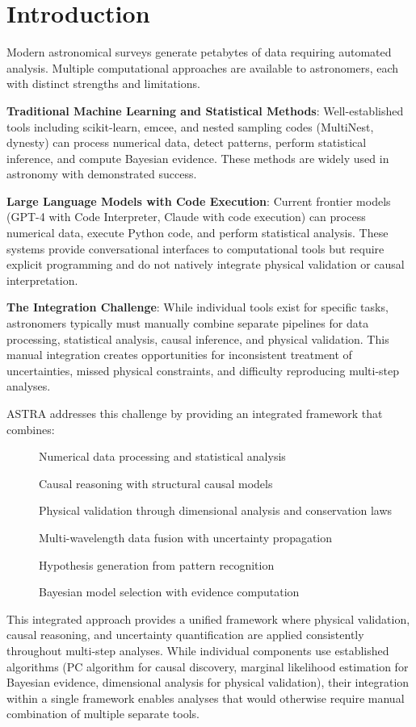 \documentclass[usenatbib]{rasti}
\begin{document}
\section{Introduction}

Modern astronomical surveys generate petabytes of data requiring automated analysis. Multiple computational approaches are available to astronomers, each with distinct strengths and limitations.

\textbf{Traditional Machine Learning and Statistical Methods}: Well-established tools including scikit-learn, emcee, and nested sampling codes (MultiNest, dynesty) can process numerical data, detect patterns, perform statistical inference, and compute Bayesian evidence. These methods are widely used in astronomy with demonstrated success.

\textbf{Large Language Models with Code Execution}: Current frontier models (GPT-4 with Code Interpreter, Claude with code execution) can process numerical data, execute Python code, and perform statistical analysis. These systems provide conversational interfaces to computational tools but require explicit programming and do not natively integrate physical validation or causal interpretation.

\textbf{The Integration Challenge}: While individual tools exist for specific tasks, astronomers typically must manually combine separate pipelines for data processing, statistical analysis, causal inference, and physical validation. This manual integration creates opportunities for inconsistent treatment of uncertainties, missed physical constraints, and difficulty reproducing multi-step analyses.

ASTRA addresses this challenge by providing an integrated framework that combines:
\begin{description}
\item[] Numerical data processing and statistical analysis
\item[] Causal reasoning with structural causal models
\item[] Physical validation through dimensional analysis and conservation laws
\item[] Multi-wavelength data fusion with uncertainty propagation
\item[] Hypothesis generation from pattern recognition
\item[] Bayesian model selection with evidence computation
\end{description}

This integrated approach provides a unified framework where physical validation, causal reasoning, and uncertainty quantification are applied consistently throughout multi-step analyses. While individual components use established algorithms (PC algorithm for causal discovery, marginal likelihood estimation for Bayesian evidence, dimensional analysis for physical validation), their integration within a single framework enables analyses that would otherwise require manual combination of multiple separate tools.
\end{document}
